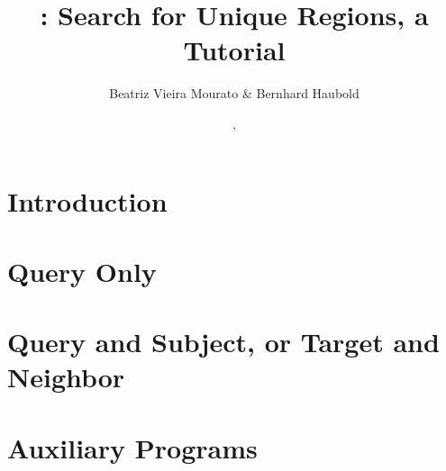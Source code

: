 \documentclass[a4paper]{report}
\begin{document}
\pagestyle{noweb}

\title{: Search for Unique Regions, a Tutorial}
\author{Beatriz Vieira Mourato \& Bernhard Haubold}
\date{\!\!, }
\maketitle

\tableofcontents

\chapter{Introduction}

\chapter{Query Only}\label{ch:q}


\chapter{Query and Subject, or Target and Neighbor}\label{ch:qs}


\chapter{Auxiliary Programs}

\label{sec:acc}


\end{document}
